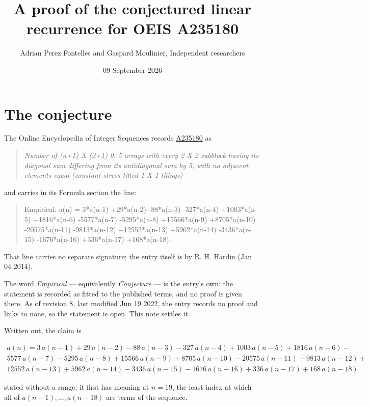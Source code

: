 \documentclass[11pt]{article}
\title{A proof of the conjectured linear recurrence for OEIS A235180}
\author{Adrian Perez Fontelles and Gaspard Moulinier, Independent researchers}
\date{09 September 2026}
\theoremstyle{definition}
\begin{document}
\maketitle
\section{The conjecture}

The Online Encyclopedia of Integer Sequences records \href{https://oeis.org/A235180}{A235180} as

\begin{quote}\itshape Number of (n+1) X (2+1) 0..5 arrays with every 2 X 2 subblock having its diagonal sum differing from its antidiagonal sum by 5, with no adjacent elements equal (constant-stress tilted 1 X 1 tilings)\end{quote}

and carries in its Formula section the line:

\begin{quote}\ttfamily Empirical: a(n) = 3*a(n-1) +29*a(n-2) -88*a(n-3) -327*a(n-4) +1003*a(n-5) +1816*a(n-6) -5577*a(n-7) -5295*a(n-8) +15566*a(n-9) +8705*a(n-10) -20575*a(n-11) -9813*a(n-12) +12552*a(n-13) +5962*a(n-14) -3436*a(n-15) -1676*a(n-16) +336*a(n-17) +168*a(n-18).\end{quote}

That line carries no separate signature; the entry itself is by R. H. Hardin (Jan 04 2014).

The word {\itshape Empirical} --- equivalently {\itshape Conjecture} --- is the entry's own: the statement is recorded as fitted to the published terms, and no proof is given there. As of revision 8, last modified Jun 19 2022, the entry records no proof and links to none, so the statement is open. This note settles it.

Written out, the claim is

\begin{multline*} a(n) = 3\,a(n-1) + 29\,a(n-2) - 88\,a(n-3) - 327\,a(n-4) + 1003\,a(n-5) + 1816\,a(n-6) - \\ 5577\,a(n-7) - 5295\,a(n-8) + 15566\,a(n-9) + 8705\,a(n-10) - 20575\,a(n-11) - 9813\,a(n-12) + \\ 12552\,a(n-13) + 5962\,a(n-14) - 3436\,a(n-15) - 1676\,a(n-16) + 336\,a(n-17) + 168\,a(n-18). \end{multline*}

stated without a range; it first has meaning at $n = 19$, the least index at which all of $a(n-1),\dots,a(n-18)$ are terms of the sequence.
\end{document}
